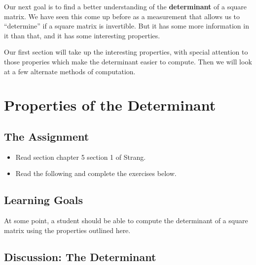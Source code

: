 \documentclass[10pt,]{book}
\newcommand{\terminology}[1]{\textbf{#1}}
\theoremstyle{plain}
\theoremstyle{definition}
\numberwithin{equation}{section}
\begin{document}
      Our next goal is to find a better understanding of the \terminology{determinant}
      of a square matrix. We have seen this come up before as a measurement that allows
      us to ``determine'' if a square matrix is invertible. But it has some more
      information in it than that, and it has some interesting properties.
\par

      Our first section will take up the interesting properties, with special attention
      to those properies which make the determinant easier to compute. Then we will
      look at a few alternate methods of computation.
\typeout{************************************************}
\typeout{************************************************}
\section[Properties of the Determinant]{Properties of the Determinant}\label{section-det-properties}
\typeout{************************************************}
\typeout{************************************************}
\subsection[The Assignment]{The Assignment}\label{subsection-115}
\begin{itemize}
\item{}
        Read section chapter 5 section 1 of Strang.
      \item{}
        Read the following and complete the exercises below.
      \end{itemize}
\typeout{************************************************}
\typeout{************************************************}
\subsection[Learning Goals]{Learning Goals}\label{subsection-116}
At some point, a student should be able to compute the determinant of a
      square matrix using the properties outlined here.
\typeout{************************************************}
\typeout{************************************************}
\subsection[Discussion: The Determinant]{Discussion: The Determinant}\label{subsection-117}
\end{document}
